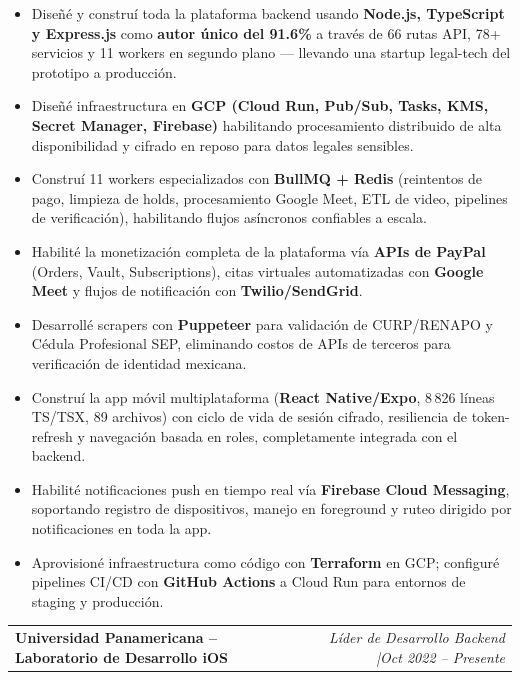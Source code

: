 \documentclass[10pt, letterpaper]{article}
\makeatletter
\newcommand{\entry}[2]{%
  \noindent\begin{tabular*}{\textwidth}{@{}l@{\extracolsep{\fill}}r@{}}
    #1 & #2
  \end{tabular*}}
\newenvironment{cvlist}{%
  \begin{itemize}[leftmargin=1.4em,itemsep=1pt,topsep=2pt,parsep=0pt]
}{\end{itemize}}
\makeatother
\begin{document}
\begin{cvlist}
  \item Dise\~{n}\'{e} y constru\'{i} toda la plataforma backend usando
        \textbf{Node.js, TypeScript y Express.js} como \textbf{autor \'{u}nico
        del 91.6\%} a trav\'{e}s de 66 rutas API, 78+ servicios y 11 workers
        en segundo plano --- llevando una startup legal-tech del prototipo a
        producci\'{o}n.
  \item Dise\~{n}\'{e} infraestructura en \textbf{GCP (Cloud Run, Pub/Sub,
        Tasks, KMS, Secret Manager, Firebase)} habilitando procesamiento
        distribuido de alta disponibilidad y cifrado en reposo para datos
        legales sensibles.
  \item Constru\'{i} 11 workers especializados con \textbf{BullMQ + Redis}
        (reintentos de pago, limpieza de holds, procesamiento Google Meet,
        ETL de video, pipelines de verificaci\'{o}n), habilitando flujos
        as\'{i}ncronos confiables a escala.
  \item Habilit\'{e} la monetizaci\'{o}n completa de la plataforma v\'{i}a
        \textbf{APIs de PayPal} (Orders, Vault, Subscriptions), citas
        virtuales automatizadas con \textbf{Google Meet} y flujos de
        notificaci\'{o}n con \textbf{Twilio/SendGrid}.
  \item Desarroll\'{e} scrapers con \textbf{Puppeteer} para validaci\'{o}n de
        CURP/RENAPO y C\'{e}dula Profesional SEP, eliminando costos de APIs
        de terceros para verificaci\'{o}n de identidad mexicana.
  \item Constru\'{i} la app m\'{o}vil multiplataforma (\textbf{React
        Native/Expo}, 8\,826 l\'{i}neas TS/TSX, 89 archivos) con ciclo de
        vida de sesi\'{o}n cifrado, resiliencia de token-refresh y navegaci\'{o}n
        basada en roles, completamente integrada con el backend.
  \item Habilit\'{e} notificaciones push en tiempo real v\'{i}a \textbf{Firebase
        Cloud Messaging}, soportando registro de dispositivos, manejo en
        foreground y ruteo dirigido por notificaciones en toda la app.
  \item Aprovision\'{e} infraestructura como c\'{o}digo con \textbf{Terraform}
        en GCP; configur\'{e} pipelines CI/CD con \textbf{GitHub Actions} a
        Cloud Run para entornos de staging y producci\'{o}n.
\end{cvlist}

\medskip

\entry{\textbf{Universidad Panamericana -- Laboratorio de Desarrollo iOS}}{%
  \textit{L\'{i}der de Desarrollo Backend \enspace|\enspace Oct 2022 -- Presente}}
\end{document}
